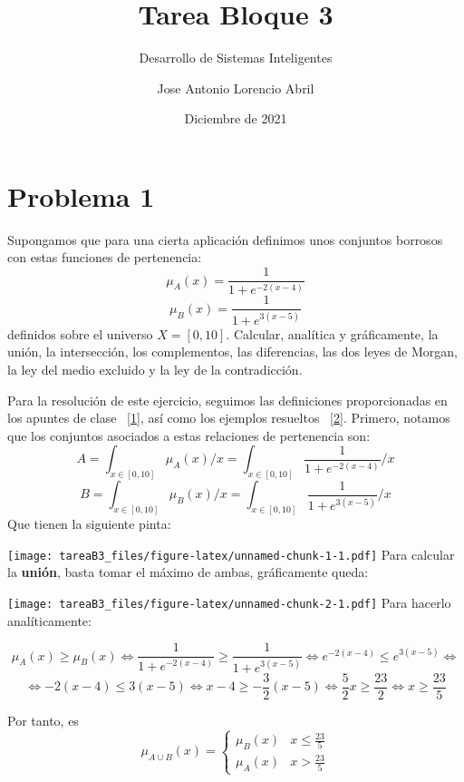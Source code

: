 \documentclass[
]{article}
\title{Tarea Bloque 3}
\subtitle{Desarrollo de Sistemas Inteligentes}
\author{Jose Antonio Lorencio Abril}
\date{Diciembre de 2021}
\begin{document}
\maketitle

\newpage

\newpage

\hypertarget{problema-1}{%
\section{Problema 1}\label{problema-1}}

 Supongamos que para una cierta aplicación definimos
unos conjuntos borrosos con estas funciones de pertenencia:
\[\mu_{A}\left(x\right)=\frac{1}{1+e^{-2\left(x-4\right)}}\]
\[\mu_{B}\left(x\right)=\frac{1}{1+e^{3\left(x-5\right)}}\] definidos
sobre el universo \(X=\left[0,10\right]\). Calcular, analítica y
gráficamente, la unión, la intersección, los complementos, las
diferencias, las dos leyes de Morgan, la ley del medio excluido y la ley
de la contradicción.

Para la resolución de este ejercicio, seguimos las definiciones
proporcionadas en los apuntes de clase
~{[}\protect\hyperlink{ref-PalmaConjuntosBorrosos}{1}{]}, así como los
ejemplos resueltos
~{[}\protect\hyperlink{ref-BotiaConjuntosBorrosos}{2}{]}. Primero,
notamos que los conjuntos asociados a estas relaciones de pertenencia
son:
\[A=\int_{x\in\left[0,10\right]}\mu_{A}\left(x\right)/x=\int_{x\in\left[0,10\right]}\frac{1}{1+e^{-2\left(x-4\right)}}/x\]
\[B=\int_{x\in\left[0,10\right]}\mu_{B}\left(x\right)/x=\int_{x\in\left[0,10\right]}\frac{1}{1+e^{3\left(x-5\right)}}/x\]
Que tienen la siguiente pinta:

\texttt{[image: tareaB3\_files/figure-latex/unnamed-chunk-1-1.pdf]}
\newpage Para calcular la \textbf{unión}, basta tomar el máximo de
ambas, gráficamente queda:

\texttt{[image: tareaB3\_files/figure-latex/unnamed-chunk-2-1.pdf]} Para
hacerlo analíticamente:

\[\mu_{A}\left(x\right)\geq\mu_{B}\left(x\right)\iff\frac{1}{1+e^{-2\left(x-4\right)}}\geq\frac{1}{1+e^{3\left(x-5\right)}}\iff e^{-2\left(x-4\right)}\leq e^{3\left(x-5\right)}\iff\]
\[\iff-2\left(x-4\right)\leq3\left(x-5\right)\iff x-4\geq-\frac{3}{2}\left(x-5\right)\iff\frac{5}{2}x\geq\frac{23}{2}\iff x\geq\frac{23}{5}\]

Por tanto, es \[\mu_{A\cup B}\left(x\right)=\begin{cases}
\mu_{B}\left(x\right) & x\leq\frac{23}{5}\\
\mu_{A}\left(x\right) & x>\frac{23}{5}
\end{cases}\]
\end{document}
